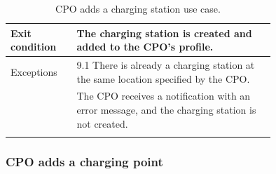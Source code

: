 \begin{center}
\begin{longtable}{lp{0.75\linewidth}}
        \hline
        Exit condition   & The charging station is created and added to the CPO’s profile.                                           \\
        \hline
        Exceptions       & 9.1 There is already a charging station at the same location specified by the CPO.                        \\
        & The CPO receives a notification with an error message, and the charging station is not created.           \\
        \hline
        \caption{CPO adds a charging station use case.}
        \label{tab: CPO_adds_charging_station_use_case}
    \end{longtable}
\end{center}

\subsubsection*{CPO adds a charging point}
